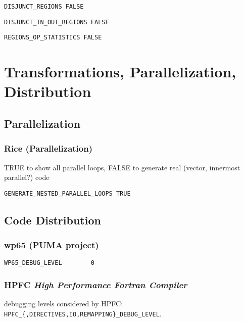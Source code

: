 \begin{verbatim}
DISJUNCT_REGIONS FALSE
\end{verbatim}

\begin{verbatim}
DISJUNCT_IN_OUT_REGIONS FALSE
\end{verbatim}


\begin{verbatim}
REGIONS_OP_STATISTICS FALSE
\end{verbatim}

\section{Transformations, Parallelization, Distribution}
\label{section-transformations}


\subsection{Parallelization}

\subsubsection{Rice (Parallelization)}

TRUE to show all parallel loops, FALSE to generate real (vector,
innermost parallel?) code

\begin{verbatim}
GENERATE_NESTED_PARALLEL_LOOPS TRUE
\end{verbatim}

\subsection{Code Distribution}

\subsubsection{wp65 (PUMA project)}

\begin{verbatim}
WP65_DEBUG_LEVEL        0
\end{verbatim}

\subsubsection{HPFC {\em High Performance Fortran Compiler}}

debugging levels considered by HPFC: 
\verb+HPFC_{,DIRECTIVES,IO,REMAPPING}_DEBUG_LEVEL+.

